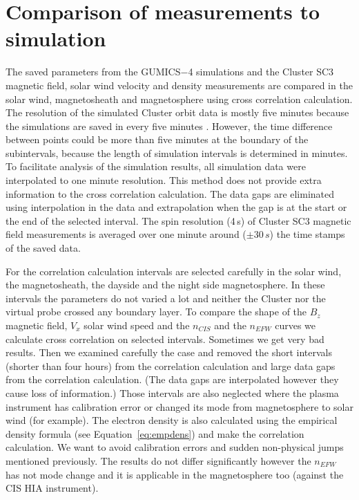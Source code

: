 \documentclass[linenumbers,draft]{agujournal}
\begin{document}
\section{Comparison of measurements to simulation}
\label{sec:comp}

The saved parameters from the GUMICS$-$4 simulations and the Cluster SC3 magnetic field, solar wind velocity and density measurements are compared in the solar wind, magnetosheath and magnetosphere using cross correlation calculation. The resolution of the simulated Cluster orbit data is mostly five minutes because the simulations are saved in every five minutes \citep{facsko16:_one_earth}. However, the time difference between points could be more than five minutes at the boundary of the subintervals, because the length of simulation intervals is determined in minutes. To facilitate analysis of the simulation results, all simulation data were interpolated to one minute resolution. This method does not provide extra information to the cross correlation calculation. The data gaps are eliminated using interpolation in the data and extrapolation when the gap is at the start or the end of the selected interval. The spin resolution (4\,s) of Cluster SC3 magnetic field measurements is averaged over one minute around ($\pm30\,s$) the time stamps of the saved data. 

For the correlation calculation intervals are selected carefully in the solar wind, the magnetosheath, the dayside and the night side magnetosphere. In these intervals the parameters do not varied a lot and neither the Cluster nor the virtual probe crossed any boundary layer. To compare the shape of the $B_z$ magnetic field, $V_x$ solar wind speed and the $n_{CIS}$ and the $n_{EFW}$ curves we calculate cross correlation on selected intervals. Sometimes we get very bad results. Then we examined carefully the case and removed the short intervals (shorter than four hours) from the correlation calculation and large data gaps from the correlation calculation. (The data gaps are interpolated however they cause loss of information.) Those intervals are also neglected where the plasma instrument has calibration error or changed its mode from magnetosphere to solar wind (for example). The electron density is also calculated using the empirical density formula (see Equation~\ref{eq:empdens}) and make the correlation calculation. We want to avoid calibration errors and sudden non-physical jumps mentioned previously. The results do not differ significantly however the $n_{EFW}$ has not mode change and it is applicable in the magnetosphere too (against the CIS HIA instrument).
\end{document}
